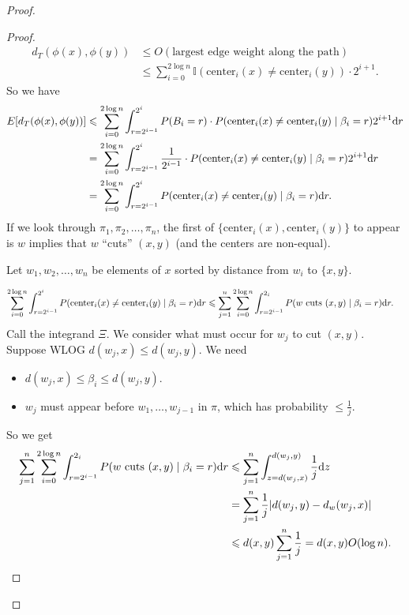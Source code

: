 \documentclass{report}
\begin{document}
\begin{proof}
    \begin{proof}
        \begin{align*}
            d_T(\phi(x), \phi(y)) &\leq O(\text{largest edge weight along the path}) \\
            &\leq \sum_{i=0}^{2\log n} \mathbb I (\text{center}_i(x) \neq \text{center}_i(y)) \cdot 2^{i+1}.
        \end{align*}
        \newpage
        So we have 
        \begin{align*}
            E[d_T(\phi(x), \phi(y))] &\leq \sum_{i=0}^{2 \log n} \int_{r = 2^{i-1}}^{2^i} P(B_i = r) \cdot P(\text{center}_i(x) \neq \text{center}_i(y) \mid \beta_i = r) 2^{i+1} \text dr \\
            &=  \sum_{i=0}^{2 \log n} \int_{r = 2^{i-1}}^{2^i} \frac{1}{2^{i-1}} \cdot P(\text{center}_i(x) \neq \text{center}_i(y) \mid \beta_i = r) 2^{i+1} \text dr \\
            &=  \sum_{i=0}^{2 \log n} \int_{r = 2^{i-1}}^{2^i}  P(\text{center}_i(x) \neq \text{center}_i(y) \mid \beta_i = r) \text dr.
        \end{align*}
        If we look through $\pi_1, \pi_2, \ldots, \pi_n$, the first of $\{\text{center}_i(x), \text{center}_i(y)\}$ to appear is $w$ implies that $w$ ``cuts'' $(x, y)$ (and the centers are non-equal).

        Let $w_1, w_2, \ldots, w_n$ be elements of $x$ sorted by distance from $w_i$ to $\{x, y\}$. 

        \begin{align*}
            \sum_{i=0}^{2 \log n} \int_{r = 2^{i-1}}^{2^i}  P(\text{center}_i(x) \neq \text{center}_i(y) \mid \beta_i = r) \text dr &\leq \sum_{j=1}^n \sum_{i=0}^{2 \log n} \int_{r = 2^{i-1}}^{2_i} P(w \text{ cuts } (x, y) \mid \beta_i = r) \text dr.
        \end{align*}
        Call the integrand $\Xi$. We consider what must occur for $w_j$ to cut $(x, y)$. Suppose WLOG $d(w_j, x) \leq d(w_j, y)$. We need 
        \begin{itemize}
            \item $d(w_j, x) \leq \beta_i \leq d(w_j, y)$.
            \item $w_j$ must appear before $w_1, \ldots, w_{j-1}$ in $\pi$, which has probability $\leq \frac 1j$. 
        \end{itemize}
        So we get 
        \begin{align*}
            \sum_{j=1}^n \sum_{i=0}^{2 \log n} \int_{r = 2^{i-1}}^{2_i} P(w \text{ cuts } (x, y) \mid \beta_i = r) \text dr &\leq \sum_{j=1}^n \int_{z = d(w_j, x)}^{d(w_j, y)} \frac 1j \text dz \\
            &= \sum_{j=1}^n \frac 1j |d(w_j, y) - d_w(w_j, x)| \\
            &\leq d(x, y) \sum_{j=1}^n \frac 1j = d(x, y) O(\log n).
        \end{align*}
    \end{proof}
    
\end{proof}
\end{document}
